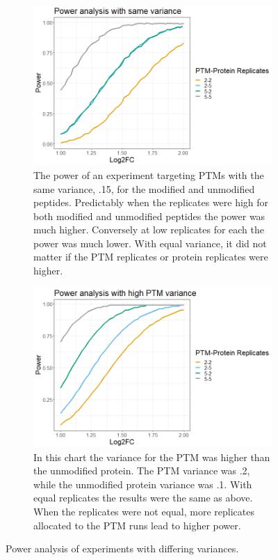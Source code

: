 \documentclass{mcp}
\begin{document}
\begin{figure}[h!]
\centering
 \begin{subfigure}{\textwidth}
 \centering
	\includegraphics[width=.75\textwidth]{sim_new/same_var_power}
	\caption{The power of an experiment targeting PTMs with the same variance, .15, for the modified and unmodified peptides. Predictably when the replicates were high for both modified and unmodified peptides the power was much higher. Conversely at low replicates for each the power was much lower. With equal variance, it did not matter if the PTM replicates or protein replicates were higher.}
 \end{subfigure}\vspace{-1mm}
 \begin{subfigure}{\textwidth}
 \centering
	\includegraphics[width=.75\textwidth]{sim_new/high_ptm_var_power}
	\caption{In this chart the variance for the PTM was higher than the unmodified protein. The PTM variance was .2, while the unmodified protein variance was .1. With equal replicates the results were the same as above. When the replicates were not equal, more replicates allocated to the PTM runs lead to higher power.}
 \end{subfigure}\vspace{-1mm}
 \caption{Power analysis of experiments with differing variances.}
\label{fig:power_sd_combo}
\end{figure}
\end{document}

